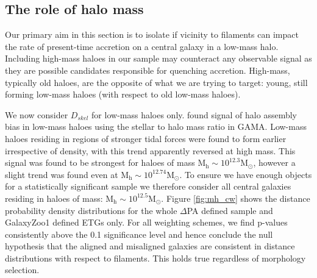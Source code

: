\subsection{The role of halo mass} 
Our primary aim in this section is to isolate if vicinity to filaments can impact the rate of present-time accretion on a central galaxy in a low-mass halo. Including high-mass haloes in our sample may counteract any observable signal as they are possible candidates responsible for quenching accretion. High-mass, typically old haloes, are the opposite of what we are trying to target: young, still forming low-mass haloes (with respect to old low-mass haloes). 

We now consider $D_{skel}$ for low-mass haloes only. \citet{tojeiro2017} found signal of halo assembly bias in low-mass haloes using the stellar to halo mass ratio in GAMA. Low-mass haloes residing in regions of stronger tidal forces were found to form earlier irrespective of density, with this trend apparently reversed at high mass. This signal was found to be strongest for haloes of mass $\mathrm{M_h \sim 10^{12.3} M_{\odot}}$, however a slight trend was found even at $\mathrm{M_h \sim 10^{12.74} M_{\odot}}$. To ensure we have enough objects for a statistically significant sample we therefore consider all central galaxies residing in haloes of mass: $\mathrm{M_h \sim 10^{12.5} M_{\odot}}$. Figure \ref{fig:mh_cw} shows the distance probability density distributions for the whole $\Delta$PA defined sample and GalaxyZoo1 defined ETGs only. For all weighting schemes, we find p-values consistently above the 0.1 significance level and hence conclude the null hypothesis that the aligned and misaligned galaxies are consistent in distance distributions with respect to filaments. This holds true regardless of morphology selection.

